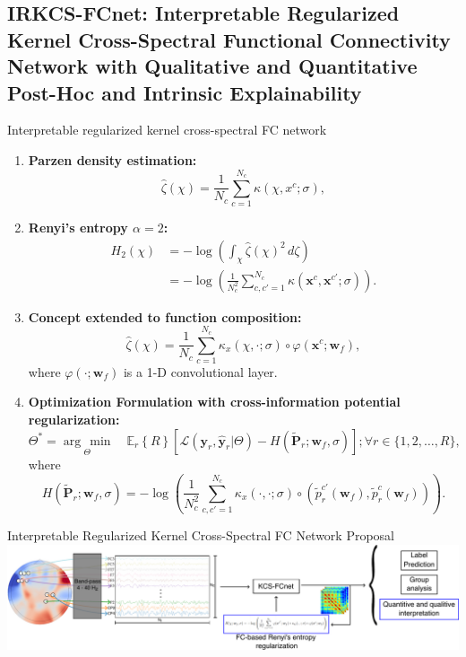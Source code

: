 \documentclass[aspectratio=169]{beamer}
\providecommand{\promeddd}[2]{\mathbb{E}_{#1}\!\left\{#2\right\}}%
\newcommand{\ve}[1]{\bm {#1}}
\newcommand{\mat}[1]{\bm {#1}}
\begin{document}
\subsection{IRKCS-FCnet: Interpretable Regularized Kernel Cross-Spectral Functional Connectivity Network with Qualitative and Quantitative Post-Hoc and Intrinsic Explainability}

\begin{frame}[allowframebreaks]{Interpretable regularized kernel cross-spectral FC network}
    \begin{enumerate}
        \item \textbf{Parzen density estimation:}
        \[
            \hat{\zeta}(\chi) = \frac{1}{N_c} \sum_{c=1}^{N_c} \kappa(\chi, x^c ; \sigma),
        \]
        \item \textbf{Renyi's entropy $\alpha=2$:}
        \[
            \begin{aligned}
                H_2(\chi) &= - \log \left( \int_{\chi} \hat{\zeta}(\chi)^2 \, d\zeta \right) \\
                          &= - \log \left( \frac{1}{N_{c}^{2}} \sum_{c,c'=1}^{N_c} \kappa ( \ve{x}^{c} , \ve{x}^{c'} ; \sigma ) \right).
            \end{aligned}
        \]
        \item \textbf{Concept extended to function composition:}
        \[
            \hat{\zeta}(\chi) = \frac{1}{N_c} \sum_{c=1}^{N_c}  \kappa_{x}(\chi, \cdot ; \sigma) \circ \varphi(\ve{x}^c; \ve{w}_f), 
        \]
        where $\varphi(\cdot; \ve{w}_f )$ is a 1-D convolutional layer.
        \item \textbf{Optimization Formulation with cross-information potential regularization:}
        \[
            \Theta^{*} = \underset{\Theta}{\arg\,\min} \quad \promeddd{r}{R} \left[ \mathcal{L}(\ve{y}_r, \hat{\ve{y}}_r | \Theta) - H(\tilde{\mat{P}}_r; \ve{w}_f, \sigma) \right]; \forall r \in \{1, 2, \dots, R\},
        \]
        where
        \[
            H(\tilde{\mat{P}}_r; \ve{w}_f, \sigma) = - \log \left( \frac{1}{N_c^2} \sum_{c, c'=1}^{N_c} \kappa_{x}(\cdot, \cdot; \sigma) \circ \left( \tilde{p}_r^{c'}(\ve{w}_f), \tilde{p}_r^{c}(\ve{w}_f) \right) \right).
        \]
    \end{enumerate}
\end{frame}


\begin{frame}{Interpretable Regularized Kernel Cross-Spectral FC Network Proposal}
    \centering
    \includegraphics[scale=0.55]{../Tesis_document/Figures/outline_and_contributions/contribution3.pdf}
\end{frame}
\end{document}
